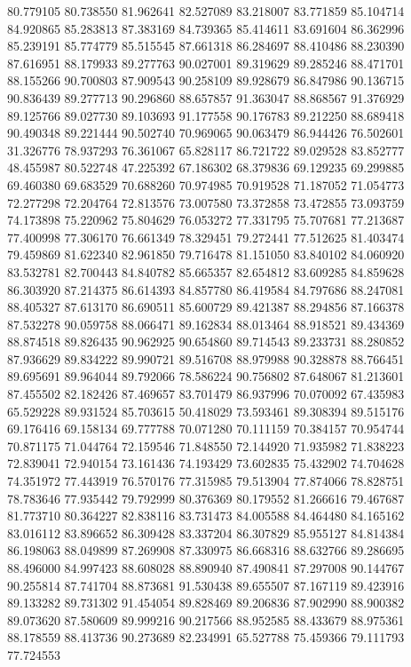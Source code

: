 80.779105
80.738550
81.962641
82.527089
83.218007
83.771859
85.104714
84.920865
85.283813
87.383169
84.739365
85.414611
83.691604
86.362996
85.239191
85.774779
85.515545
87.661318
86.284697
88.410486
88.230390
87.616951
88.179933
89.277763
90.027001
89.319629
89.285246
88.471701
88.155266
90.700803
87.909543
90.258109
89.928679
86.847986
90.136715
90.836439
89.277713
90.296860
88.657857
91.363047
88.868567
91.376929
89.125766
89.027730
89.103693
91.177558
90.176783
89.212250
88.689418
90.490348
89.221444
90.502740
70.969065
90.063479
86.944426
76.502601
31.326776
78.937293
76.361067
65.828117
86.721722
89.029528
83.852777
48.455987
80.522748
47.225392
67.186302
68.379836
69.129235
69.299885
69.460380
69.683529
70.688260
70.974985
70.919528
71.187052
71.054773
72.277298
72.204764
72.813576
73.007580
73.372858
73.472855
73.093759
74.173898
75.220962
75.804629
76.053272
77.331795
75.707681
77.213687
77.400998
77.306170
76.661349
78.329451
79.272441
77.512625
81.403474
79.459869
81.622340
82.961850
79.716478
81.151050
83.840102
84.060920
83.532781
82.700443
84.840782
85.665357
82.654812
83.609285
84.859628
86.303920
87.214375
86.614393
84.857780
86.419584
84.797686
88.247081
88.405327
87.613170
86.690511
85.600729
89.421387
88.294856
87.166378
87.532278
90.059758
88.066471
89.162834
88.013464
88.918521
89.434369
88.874518
89.826435
90.962925
90.654860
89.714543
89.233731
88.280852
87.936629
89.834222
89.990721
89.516708
88.979988
90.328878
88.766451
89.695691
89.964044
89.792066
78.586224
90.756802
87.648067
81.213601
87.455502
82.182426
87.469657
83.701479
86.937996
70.070092
67.435983
65.529228
89.931524
85.703615
50.418029
73.593461
89.308394
89.515176
69.176416
69.158134
69.777788
70.071280
70.111159
70.384157
70.954744
70.871175
71.044764
72.159546
71.848550
72.144920
71.935982
71.838223
72.839041
72.940154
73.161436
74.193429
73.602835
75.432902
74.704628
74.351972
77.443919
76.570176
77.315985
79.513904
77.874066
78.828751
78.783646
77.935442
79.792999
80.376369
80.179552
81.266616
79.467687
81.773710
80.364227
82.838116
83.731473
84.005588
84.464480
84.165162
83.016112
83.896652
86.309428
83.337204
86.307829
85.955127
84.814384
86.198063
88.049899
87.269908
87.330975
86.668316
88.632766
89.286695
88.496000
84.997423
88.608028
88.890940
87.490841
87.297008
90.144767
90.255814
87.741704
88.873681
91.530438
89.655507
87.167119
89.423916
89.133282
89.731302
91.454054
89.828469
89.206836
87.902990
88.900382
89.073620
87.580609
89.999216
90.217566
88.952585
88.433679
88.975361
88.178559
88.413736
90.273689
82.234991
65.527788
75.459366
79.111793
77.724553
